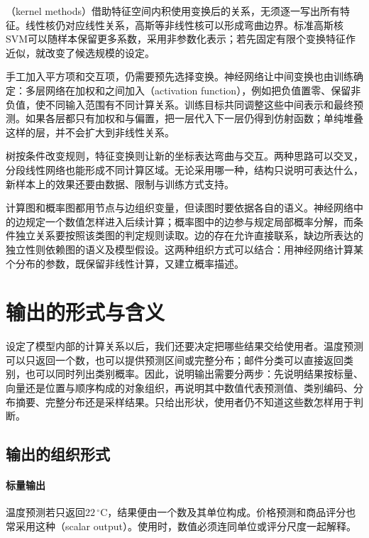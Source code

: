 （kernel methods）借助特征空间内积使用变换后的关系，无须逐一写出所有特征。线性核仍对应线性关系，高斯等非线性核可以形成弯曲边界。标准高斯核SVM可以随样本保留更多系数，采用非参数化表示；若先固定有限个变换特征作近似，就改变了候选规模的设定。

手工加入平方项和交互项，仍需要预先选择变换。神经网络让中间变换也由训练确定：多层网络在加权和之间加入（activation function），例如把负值置零、保留非负值，使不同输入范围有不同计算关系。训练目标共同调整这些中间表示和最终预测。如果各层都只有加权和与偏置，把一层代入下一层仍得到仿射函数；单纯堆叠这样的层，并不会扩大到非线性关系。

树按条件改变规则，特征变换则让新的坐标表达弯曲与交互。两种思路可以交叉，分段线性网络也能形成不同计算区域。无论采用哪一种，结构只说明可表达什么，新样本上的效果还要由数据、限制与训练方式支持。

计算图和概率图都用节点与边组织变量，但读图时要依据各自的语义。神经网络中的边规定一个数值怎样进入后续计算；概率图中的边参与规定局部概率分解，而条件独立关系要按照该类图的判定规则读取。边的存在允许直接联系，缺边所表达的独立性则依赖图的语义及模型假设。这两种组织方式可以结合：用神经网络计算某个分布的参数，既保留非线性计算，又建立概率描述。

\FloatBarrier
\section{输出的形式与含义}
\label{sec:models-output}

设定了模型内部的计算关系以后，我们还要决定把哪些结果交给使用者。温度预测可以只返回一个数，也可以提供预测区间或完整分布；邮件分类可以直接返回类别，也可以同时列出类别概率。因此，说明输出需要分两步：先说明结果按标量、向量还是位置与顺序构成的对象组织，再说明其中数值代表预测值、类别编码、分布摘要、完整分布还是采样结果。只给出形状，使用者仍不知道这些数怎样用于判断。

\subsection{输出的组织形式}
\label{sec:models-output-form}

\paragraph{标量输出}
\label{sec:models-scalar-output}

温度预测若只返回$22\,^{\circ}\mathrm{C}$，结果便由一个数及其单位构成。价格预测和商品评分也常采用这种（scalar output）。使用时，数值必须连同单位或评分尺度一起解释。

